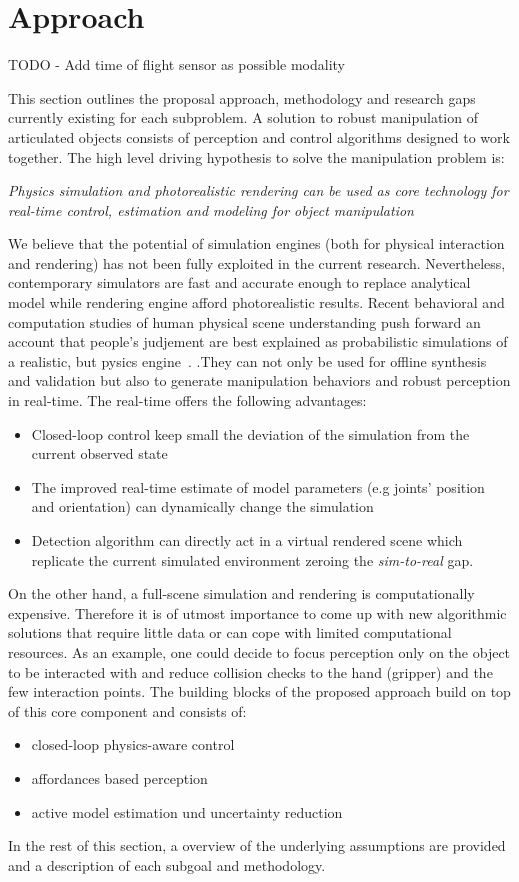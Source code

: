 \section{Approach}
\label{sec:Approach}
TODO
- Add time of flight sensor as possible modality

This section outlines the proposal approach, methodology and research gaps currently existing for each subproblem. A solution to robust manipulation of articulated objects consists of perception and control algorithms designed to work together. The high level driving hypothesis to solve the manipulation problem is:
\begin{displayquote}
\textit{Physics simulation and photorealistic rendering can be used as core technology for real-time control, estimation and modeling for object manipulation}
\end{displayquote}   
We believe that the potential of simulation engines (both for physical interaction and rendering) has not been fully exploited in the current research. Nevertheless, contemporary simulators are fast and accurate enough to replace analytical model while rendering engine afford photorealistic results. Recent behavioral and computation studies of human physical scene understanding push forward an account that people's judjement are best explained as probabilistic simulations of a realistic, but pysics engine~\cite{wu2015galileo}.
.They can not only be used for offline synthesis and validation but also to generate manipulation behaviors and robust perception in real-time. The real-time offers the following advantages:
\begin{itemize}
\item Closed-loop control keep small the deviation of the simulation from the current observed state
\item The improved real-time estimate of model parameters (e.g joints' position and orientation) can dynamically change the simulation
\item Detection algorithm can directly act in a virtual rendered scene which replicate the current simulated environment zeroing the \emph{sim-to-real} gap.
\end{itemize}
On the other hand, a full-scene simulation and rendering is computationally expensive. Therefore it is of utmost importance to come up with new algorithmic solutions that require little data or can cope with limited computational resources. As an example, one could decide to focus perception only on the object to be interacted with and reduce collision checks to the hand (gripper) and the few interaction points.  
The building blocks of the proposed approach build on top of this core component and consists of:
\begin{itemize}
\item closed-loop physics-aware control
\item affordances based perception
\item active model estimation und uncertainty reduction
\end{itemize}
In the rest of this section, a overview of the underlying assumptions are provided and a description of each subgoal and methodology. 


